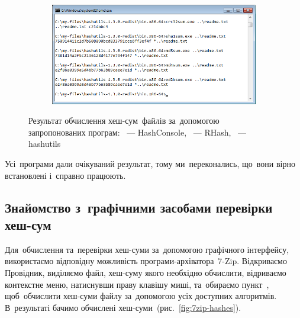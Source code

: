 \documentclass[
	a4paper,
	oneside,
	BCOR = 10mm,
	DIV = 12,
	12pt,
	headings = normal,
]{scrartcl}
\newlength{\gridunitwidth}
\begin{document}
\begin{figure}[!htbp]
\begin{subfigure}[b]{6\gridunitwidth - 1em / 2}
					\caption{}
					\label{subfig:win-cmd-hash-results-rhash}
				\end{subfigure}
				\begin{subfigure}{6\gridunitwidth - 1em / 2}
					\centering
					\includegraphics[width = \columnwidth]{./assets/04.png}
					\caption{}
					\label{subfig:win-cmd-hash-results-hashutils}
				\end{subfigure}%
				\caption{Результат обчислення хеш-сум~файлів за~допомогою запропонованих програм: ~— \textenglish{HashConsole}, ~— \textenglish{RHash}, ~— \textenglish{hashutils}}
				\label{fig:win-cmd-hash-results}
			\end{figure}

			Усі~програми дали очікуваний результат, тому ми~переконались, що~вони вірно встановлені і~справно працюють.

		\subsection{Знайомство з~графічними засобами перевірки хеш-сум}
			Для~обчислення та~перевірки хеш-суми за~допомогою графічного інтерфейсу, використаємо відповідну можливість програми-архіватора~\textenglish{7-Zip}. Відкриваємо Провідник, виділяємо файл, хеш-суму якого необхідно обчислити, відриваємо контекстне меню, натиснувши праву клавішу миші, та~обираємо пункт~, щоб~обчислити хеш-суми файлу за~допомогою усіх доступних алгоритмів. В~результаті бачимо обчислені хеш-суми~(рис.~\ref{fig:7zip-hashes}).
\end{document}

